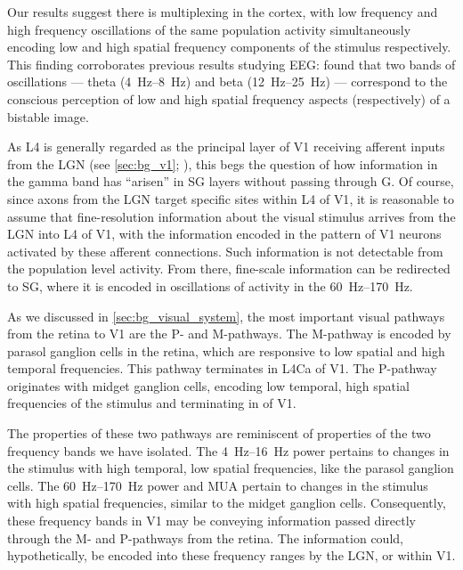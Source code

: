 Our results suggest there is multiplexing in the cortex, with low frequency and high frequency oscillations of the same population activity simultaneously encoding low and high spatial frequency components of the stimulus respectively.
This finding corroborates previous results studying \ac{EEG}: \citet{Smith2006} found that two bands of oscillations --- theta (\SIrange{4}{8}{Hz}) and beta (\SIrange{12}{25}{Hz}) --- correspond to the conscious perception of low and high spatial frequency aspects (respectively) of a bistable image.

As \ac{L4} is generally regarded as the principal layer of \ac{V1} receiving afferent inputs from the \ac{LGN} (see \autoref{sec:bg_v1}; \citealp{Callaway1998,Horton2005,Nassi2009,Harris2013}), this begs the question of how information in the gamma band has ``arisen'' in \ac{SG} layers without passing through \ac{G}.
Of course, since axons from the \ac{LGN} target specific sites within \ac{L4} of \ac{V1}, it is reasonable to assume that fine-resolution information about the visual stimulus arrives from the \ac{LGN} into \ac{L4} of \ac{V1}, with the information encoded in the pattern of \ac{V1} neurons activated by these afferent connections.
Such information is not detectable from the population level activity.
From there, fine-scale information can be redirected to \ac{SG}, where it is encoded in oscillations of activity in the \SIrange{60}{170}{Hz}.

As we discussed in \autoref{sec:bg_visual_system}, the most important visual pathways from the retina to \ac{V1} are the P- and M-pathways.
The M-pathway is encoded by parasol ganglion cells in the retina, which are responsive to low spatial and high temporal frequencies.
This pathway terminates in \ac{L4Ca} of \ac{V1}.
The P-pathway originates with midget ganglion cells, encoding low temporal, high spatial frequencies of the stimulus and terminating in  of \ac{V1}.

The properties of these two pathways are reminiscent of properties of the two frequency bands we have isolated.
The \SIrange{4}{16}{Hz} power pertains to changes in the stimulus with high temporal, low spatial frequencies, like the parasol ganglion cells.
The \SIrange{60}{170}{Hz} power and \ac{MUA} pertain to changes in the stimulus with high spatial frequencies, similar to the midget ganglion cells.
Consequently, these frequency bands in \ac{V1} may be conveying information passed directly through the M- and P-pathways from the retina.
The information could, hypothetically, be encoded into these frequency ranges by the \ac{LGN}, or within \ac{V1}.

